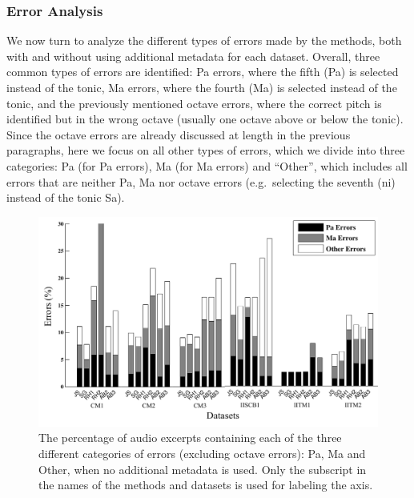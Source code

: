 {\subsubsection{Error Analysis}
\label{sec:pre_processing_tonic_identification_error_analysis}

We now turn to analyze the different types of errors made by the methods, both with and without using additional metadata for each dataset. Overall, three common types of errors are identified: Pa errors, where the fifth (Pa) is selected instead of the tonic, Ma errors, where the fourth (Ma) is selected instead of the tonic, and the previously mentioned octave errors, where the correct pitch is identified but in the wrong octave (usually one octave above or below the
tonic). Since the octave errors are already discussed at length in the previous paragraphs, here we focus on all other types of errors, which we divide into three categories: Pa (for Pa errors), Ma (for Ma errors) and ``Other'', which includes all errors that are neither Pa, Ma nor octave errors (e.g.~selecting the seventh (\gls{ni}) instead of the tonic Sa).


\begin{figure}
	\begin{center}
		\includegraphics[width=\figSizeHundred]{ch05_preprocessing/figures/ErrorAnalysis_Without_MF.pdf}
	\end{center}
	\caption[Percentage of Pa, Ma and `Other' type errors in tonic identification]{The percentage of audio excerpts containing each of the three different categories of errors (excluding octave errors): Pa, Ma and Other, when no additional metadata is used. Only the subscript in the names of the methods and datasets is used for labeling the axis.}
	\label{fig:tonic_identification_errors_without_MF}
\end{figure}

}
